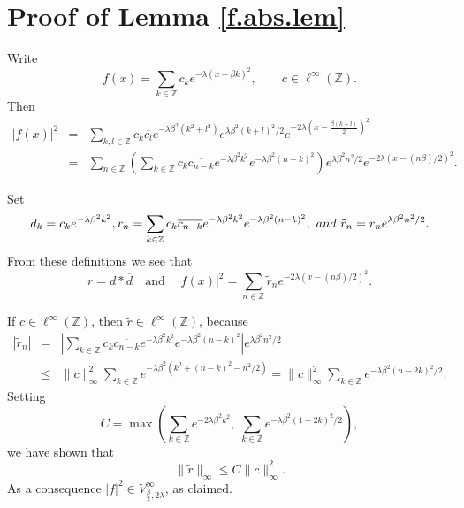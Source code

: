 \documentclass[11pt,oneside,reqno]{amsart}
\numberwithin{equation}{section}
\def\Z{ {\mathbb Z} }
\begin{document}
\appendix
 

\section{Proof of Lemma \ref{f.abs.lem}}
\label{lem.pr.sis}



Write
\[
f(x)=\sum_{k\in\mathbb{Z}} c_k e^{-\lambda(x-\beta k)^2},
\qquad c\in \ell^\infty(\mathbb{Z}).
\]
Then 
\begin{eqnarray*}
|f(x)|^2
&=&\sum_{k,l\in\mathbb{Z}} c_k\overline{c_l}
e^{-\lambda\beta^2(k^2+l^2)} e^{\lambda \beta^2 (k+l)^2/2}
e^{-2\lambda\left(x-\frac{\beta(k+l)}{2}\right)^2} \nonumber \\
&=&\sum_{n\in\mathbb{Z}}
\left(\sum_{k\in\mathbb{Z}} c_k \overline{c_{n-k}}
e^{-\lambda\beta^2 k^2} e^{-\lambda\beta^2(n-k)^2}\right)
e^{\lambda\beta^2 n^2/2} e^{-2\lambda(x-(n\beta)/2)^2}.
\end{eqnarray*}

Set
\begin{equation*}
d_k=c_k e^{-\lambda\beta^2 k^2}, 
r_n=\sum_{k\in\mathbb{Z}} c_k \overline{c_{n-k}}
e^{-\lambda\beta^2 k^2} e^{-\lambda\beta^2(n-k)^2}, \ {\rm and } \ 
\tilde r_n = r_n e^{\lambda\beta^2 n^2/2}.
\end{equation*}
From these definitions we see that
\begin{equation*}
r=d*\overline{d}
\quad\text{and}\quad
|f(x)|^2=\sum_{n\in\mathbb{Z}} \tilde r_n
e^{-2\lambda(x-(n\beta)/2)^2}.
\end{equation*}

If $c\in \ell^\infty(\mathbb{Z})$, then $\tilde r\in \ell^\infty(\mathbb{Z})$,
because
\begin{eqnarray*}
|\tilde r_n|
&=&\left|
\sum_{k\in\mathbb{Z}} c_k\overline{c_{n-k}}
e^{-\lambda\beta^2  k^2} e^{-\lambda\beta^2(n-k)^2}
\right| e^{\lambda\beta^2 n^2/2} \\
&\le& \|c\|_\infty^2
\sum_{k\in\mathbb{Z}} e^{-\lambda\beta^2(k^2+(n-k)^2-n^2/2)} =\|c\|_\infty^2
\sum_{k\in\mathbb{Z}} e^{-\lambda\beta^2 (n-2k)^2/2}.
\end{eqnarray*}
Setting
\[
C=\max\!\left(
\sum_{k\in\mathbb{Z}} e^{-2\lambda\beta^2 k^2},
\;
\sum_{k\in\mathbb{Z}} e^{-\lambda\beta^2(1-2k)^2/2}
\right),
\]
we have shown that
\begin{equation*}
\|\tilde r\|_\infty \le C \|c\|_\infty^2.
\end{equation*}
As a consequence $|f|^2\in V_{\frac{\beta}{2}, 2\lambda}^\infty$, as claimed.
\end{document}
